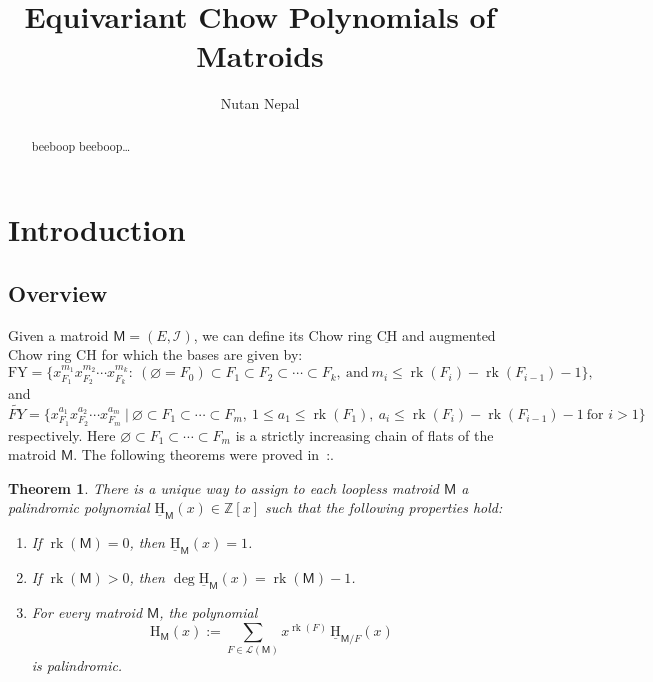 \documentclass[11pt, a4paper, english]{amsart}
\title[Equivariant Chow Polynomials of Matroids]{Equivariant Chow Polynomials of Matroids}
\author[N. Nepal]{Nutan Nepal}
\theoremstyle{teoremas}
\newtheorem{theorem}{Theorem}[section]
\theoremstyle{definition}
\DeclareMathOperator{\rk}{rk}
\newcommand{\M}{\mathsf{M}}
\newcommand{\cI}{\mathcal{I}}
\newcommand{\Z}{\mathbb{Z}}
\newcommand{\rank}{\operatorname{rk}}
\renewcommand{\H}{\mathrm{H}}
\newcommand{\CH}{\mathrm{CH}}
\newcommand{\uH}{\underline{\mathrm{H}}}
\newcommand{\uCH}{\underline{\mathrm{CH}}}
\begin{document}
\begin{abstract}
    beeboop beeboop\dots
\end{abstract}

\maketitle

\section{Introduction}\label{sec:introduction}

\subsection{Overview}
Given a matroid $\M = (E, \cI)$, we can define its Chow ring $\uCH$ and augmented Chow ring $\CH$ for which the bases are given by:
    $$\text{FY}=\{x_{F_1}^{m_1}x_{F_2}^{m_2}\cdots x_{F_k}^{m_k}:\ (\varnothing = F_0)\subset
        F_1\subset F_2\subset\cdots\subset
        F_k,\ \text{and}\ m_i\leq\rank(F_i)-\rank(F_{i-1})-1 \},$$
and
    $$\widetilde{FY} = \{x_{F_1}^{a_1}x_{F_2}^{a_2}\cdots x_{F_m}^{a_m}\ 
    |\ \varnothing\subset F_1\subset\cdots\subset F_m,\ 1\leq a_1\leq \rank(F_1)
    ,\ a_i\leq\rank(F_i)-\rank(F_{i-1})-1\ \text{for } i>1\}$$
respectively. Here $\varnothing\subset F_1\subset\cdots\subset F_m$ is a strictly increasing chain of flats of the matroid $\M$.
The following theorems were proved in~\cite{fmsv24}:.

\begin{theorem}\label{thm:fmsv-main-recursion-defi-H-and-uH}
    There is a unique way to assign to each loopless matroid $\M$ a palindromic polynomial $\uH_{\M}(x) \in \Z[x]$ such that the following properties hold:
    \begin{enumerate}[\normalfont(i)]
        \item If $\rk(\M) = 0$, then $\uH_{\M}(x) = 1$.\label{it:fmsv-mainfirst}\
        \item If $\rk(\M) > 0$, then $\deg \uH_{\M}(x) = \rk(\M) - 1$.\label{it:fmsv-mainsecond}
        \item For every matroid $\M$, the polynomial
            \[ \H_{\M}(x) := \sum_{F\in \mathcal{L}(\M)} x^{\rk(F)}\, \uH_{\M/F}(x)\]
        is palindromic.\label{it:fmsv-mainthird}
    \end{enumerate}
\end{theorem}
\end{document}
